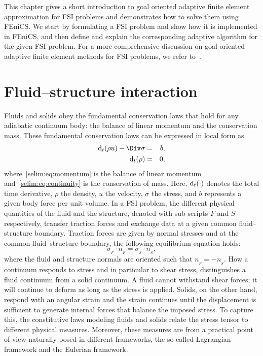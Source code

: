 This chapter gives a short introduction to goal oriented adaptive
finite element approximation for FSI problems and demonstrates how to
solve them using FEniCS. We start by formulating a FSI problem and
show how it is implemented in FEniCS, and then define and explain the
corresponding adaptive algorithm for the given FSI problem. For a more
comprehensive discussion on goal oriented adaptive finite element
methods for FSI problems, we refer to~\cite{SelimNarayananEtAl2010,
  Dunne2007, GratschBathe2006, BengzonLarson2010, Van2009,
  FickZeeBrummelen2008}.

\section{Fluid--structure interaction}
\label{selim:sec:fsi}
Fluids and solids obey the fundamental conservation laws that hold
for any adiabatic continuum body: the balance of linear momentum and
the conservation mass.  These fundamental conservation laws can be
expressed in local form as
\begin{eqnarray}
\label{selim:eq:momentum}
\subdt(\rho u) - \Div \sigma &=& b, \\
\label{selim:eq:continuity}
\subdt(\rho )  &=& 0,
\end{eqnarray}
where~\eqref{selim:eq:momentum} is the balance of linear momentum
and~\eqref{selim:eq:continuity} is the conservation of mass.  Here,
$\textrm{d}_t(\cdot)$ denotes the total time derivative, $\rho$ the density,
$u$ the velocity, $\sigma$ the stress, and $b$ represents a given body
force per unit volume. In a FSI problem, the different physical
quantities of the fluid and the structure, denoted with sub scripts
$F$ and $S$ respectively, transfer traction forces and exchange data
at a given common fluid--structure boundary.  Traction forces are
given by normal stresses and at the common fluid--structure boundary,
the following equilibrium equation holds:
\begin{equation}
\label{selim:eq:traction}
\sigma_{_{F}}\cdot n_{_{F}} = \sigma_{_{S}}\cdot n_{_{S}},
\end{equation}
where the fluid and structure normals are oriented such that
$n_{_{F}}= -n_{_{S}}$.  How a continuum responds to stress and in
particular to shear stress, distinguishes a fluid continuum from a
solid continuum. A fluid cannot withstand shear forces; it will
continue to deform as long as the stress is applied. Solids, on the
other hand, respond with an angular strain and the strain continues
until the displacement is sufficient to generate internal forces that
balance the imposed stress. To capture this, the constitutive laws
modeling fluids and solids relate the stress tensor to different
physical measures. Moreover, these measures are from a practical point
of view naturally posed in different frameworks, the so-called
Lagrangian framework and the Eulerian framework.

